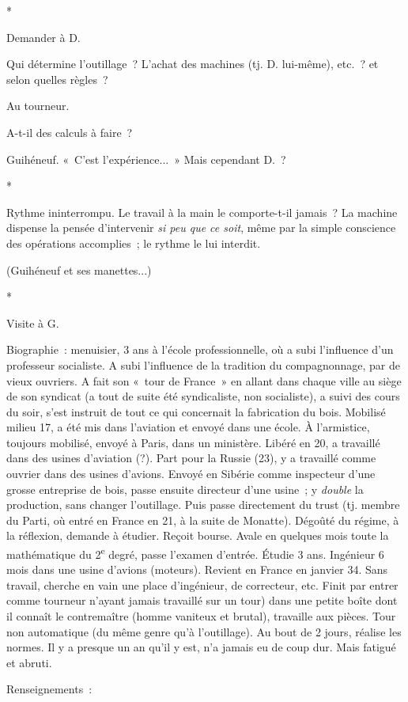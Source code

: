 \documentclass[french,twoside]{book} %
\begin{document}
\begin{center}
*\end{center}
\noindent Demander à D.\par
Qui détermine l'outillage ? L'achat des machines (tj. D. lui-même), etc. ? et selon quelles règles ?\par
Au tourneur.\par
A-t-il des calculs à faire ?\par
Guihéneuf. « C'est l'expérience... » Mais cependant D. ?\par

\begin{center}
*\end{center}
\noindent Rythme ininterrompu. Le travail à la main le comporte-t-il jamais ? La machine dispense la pensée d'intervenir {\itshape si peu que ce soit}, même par la simple conscience des opérations accomplies ; le rythme le lui interdit.\par
(Guihéneuf et ses manettes...)\par

\begin{center}
*\end{center}
\noindent Visite à G.\par
Biographie : menuisier, 3 ans à l'école professionnelle, où a subi l'influence d'un professeur socialiste. A subi l'influence de la tradition du compagnonnage, par de vieux ouvriers. A fait son « tour de France » en allant dans chaque ville au siège de son syndicat (a tout de suite été syndicaliste, non socialiste), a suivi des cours du soir, s'est instruit de tout ce qui concernait la fabrication du bois. Mobilisé milieu 17, a été mis dans l'aviation et envoyé dans une école. À l'armistice, toujours mobilisé, envoyé à Paris, dans un ministère. Libéré en 20, a travaillé dans des usines d'aviation (?). Part pour la Russie (23), y a travaillé comme ouvrier dans des usines d'avions. Envoyé en Sibérie comme inspecteur d'une grosse entreprise de bois, passe ensuite directeur d'une usine ; y {\itshape double} la production, sans changer l'outillage. Puis passe directement du trust (tj. membre du Parti, où entré en France en 21, à la suite de Monatte). Dégoûté du régime, à la réflexion, demande à étudier. Reçoit bourse. Avale en quelques mois toute la mathématique du 2\textsuperscript{e} degré, passe l'examen d'entrée. Étudie 3 ans. Ingénieur 6 mois dans une usine d'avions (moteurs). Revient en France en janvier 34. Sans travail, cherche en vain une place d'ingénieur, de correcteur, etc. Finit par entrer comme tourneur n'ayant jamais travaillé sur un tour) dans une petite boîte dont il connaît le contremaître (homme vaniteux et brutal), travaille aux pièces. Tour non automatique (du même genre qu'à l'outillage). Au bout de 2 jours, réalise les normes. Il y a presque un an qu'il y est, n'a jamais eu de coup dur. Mais fatigué et abruti.\par
Renseignements :\par
\end{document}
